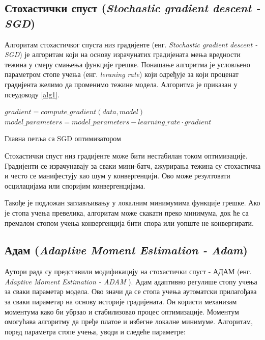 \documentclass[a4paper, 12pt, master, utf8]{etf}
\begin{document}
\subsection{Стохастички спуст (\textit{Stochastic gradient descent - SGD})}

Алгоритам стохастичког спуста низ градијенте (енг. \textit{Stochastic gradient descent - SGD}) је алгоритам који на основу израчунатих градијената мења вредности тежина у смеру смањења функције грешке.
Понашање алгоритма је условљено параметром стопе учења (енг. \textit{leraning rate}) који одређује за који проценат градијента желимо да променимо тежине модела.
Алгоритма је приказан у псеудокоду \ref{alg1}.
\newline

\begin{algorithm}
    \label{alg1}
    \DontPrintSemicolon
     {
         {
            $gradient = compute\_gradient(data, model)$ \;
            $model\_parameters = model\_parameters - learning\_rate \cdot gradient$ \;
        }
    }
    \caption{Главна петља са SGD оптимизатором}
\end{algorithm}

Стохастички спуст низ градијенте може бити нестабилан током оптимизације. Градијенти се израчунавају за сваки мини-батч, ажурирања тежина су стохастичка и често се манифестују као шум у конвергенцији. Ово може резултовати осцилацијама или споријим конвергенцијама.

Такође је подложан заглављивању у локалним минимумима функције грешке. Ако је стопа учења превелика, алгоритам може скакати преко минимума, док ће са премалом стопом учења конвергенција бити спора или уопште не конвергирати.
\newline

\subsection{Адам (\textit{Adaptive Moment Estimation - Adam})}

Аутори рада \cite{kingma_adam_2017} су представили модификацију на стохастички спуст - АДАМ (енг. \textit{Adaptive Moment Estimation - ADAM }).
Адам адаптивно регулише стопу учења за сваки параметар модела. Ово значи да се стопа учења аутоматски прилагођава за сваки параметар на основу историје градијената.
Он користи механизам моментума како би убрзао и стабилизовао процес оптимизације. Моментум омогућава алгоритму да пређе платое и избегне локалне минимуме.
Алгоритам, поред параметра стопе учења, уводи и следеће параметре:
\end{document}
